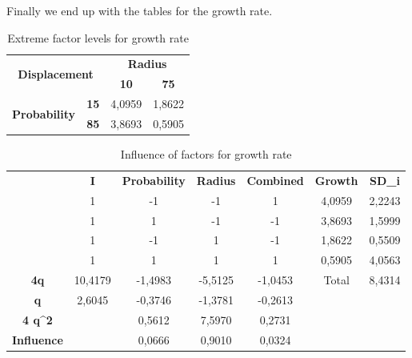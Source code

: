 Finally we end up with the tables for the growth rate.


\begin{table}[H]
\centering
\begin{tabular}{|cc|cc|}
\hline
\multicolumn{2}{|c|}{\multirow{2}{*}{\textbf{Displacement}}} & \multicolumn{2}{c|}{\textbf{Radius}} \\ \cline{3-4} 
\multicolumn{2}{|c|}{} & \multicolumn{1}{c|}{\textbf{10}} & \textbf{75} \\ \hline
\multicolumn{1}{|c|}{\multirow{2}{*}{\textbf{Probability}}} & \textbf{15} & \multicolumn{1}{c|}{4,0959} & 1,8622 \\ \cline{2-4} 
\multicolumn{1}{|c|}{} & \textbf{85} & \multicolumn{1}{c|}{3,8693} & 0,5905 \\ \hline
\end{tabular}
\caption{Extreme factor levels for growth rate}
\end{table}

\begin{table}[H]
\centering
\begin{tabular}{c|c|c|c|c|cc}
\cline{2-7}
 & \textbf{I} & \textbf{Probability} & \textbf{Radius} & \textbf{Combined} & \multicolumn{1}{c|}{\textbf{Growth}} & \multicolumn{1}{c|}{\textbf{SD\_i}} \\ \cline{2-7} 
 & 1 & -1 & -1 & 1 & \multicolumn{1}{c|}{4,0959} & \multicolumn{1}{c|}{2,2243} \\ \cline{2-7} 
 & 1 & 1 & -1 & -1 & \multicolumn{1}{c|}{3,8693} & \multicolumn{1}{c|}{1,5999} \\ \cline{2-7} 
 & 1 & -1 & 1 & -1 & \multicolumn{1}{c|}{1,8622} & \multicolumn{1}{c|}{0,5509} \\ \cline{2-7} 
 & 1 & 1 & 1 & 1 & \multicolumn{1}{c|}{0,5905} & \multicolumn{1}{c|}{4,0563} \\ \hline
\multicolumn{1}{|c|}{\textbf{4q}} & 10,4179 & -1,4983 & -5,5125 & -1,0453 & \multicolumn{1}{c|}{Total} & \multicolumn{1}{c|}{8,4314} \\ \hline
\multicolumn{1}{|c|}{\textbf{q}} & 2,6045 & -0,3746 & -1,3781 & -0,2613 &  &  \\ \cline{1-5}
\multicolumn{1}{|c|}{\textbf{4 q\textasciicircum{}2}} &  & 0,5612 & 7,5970 & 0,2731 &  &  \\ \cline{1-5}
\multicolumn{1}{|c|}{\textbf{Influence}} &  & 0,0666 & 0,9010 & 0,0324 &  &  \\ \cline{1-5}
\end{tabular}
\caption{Influence of factors for growth rate}
\end{table}


